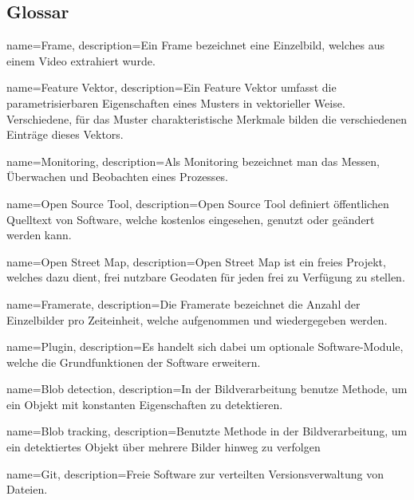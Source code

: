 \subsection{Glossar}

{
  name=Frame,
  description={Ein Frame bezeichnet eine Einzelbild, welches aus einem Video extrahiert wurde. \cite{frame}}
}

{
  name=Feature Vektor,
  description={Ein Feature Vektor umfasst die parametrisierbaren Eigenschaften eines Musters in vektorieller Weise. Verschiedene, für das Muster charakteristische Merkmale bilden die verschiedenen Einträge dieses Vektors. \cite{featureVector}}
}

{
  name=Monitoring,
  description={Als Monitoring bezeichnet man das Messen, Überwachen und Beobachten eines Prozesses. \cite{monitoring}}
}

{
  name=Open Source Tool,
  description={Open Source Tool definiert öffentlichen Quelltext von Software, welche kostenlos eingesehen, genutzt oder geändert werden kann. \cite{ost}}
}

{
  name=Open Street Map,
  description={Open Street Map ist ein freies Projekt, welches dazu dient, frei nutzbare Geodaten für jeden frei zu Verfügung zu stellen. \cite{osm}}
}

{
  name=Framerate,
  description={Die Framerate bezeichnet die Anzahl der Einzelbilder pro Zeiteinheit, welche aufgenommen und wiedergegeben werden. \cite{framerate}}
}

{
  name=Plugin,
  description={Es handelt sich dabei um optionale Software-Module, welche die Grundfunktionen der Software erweitern. \cite{plugin}}
}

{
  name=Blob detection,
  description={In der Bildverarbeitung benutze Methode, um ein Objekt mit konstanten Eigenschaften zu detektieren. \cite{blobDet}}
}

{
  name=Blob tracking,
  description={Benutzte Methode in der Bildverarbeitung, um ein detektiertes Objekt über mehrere Bilder hinweg zu verfolgen}
}


{
  name=Git,
  description={Freie Software zur verteilten Versionsverwaltung von Dateien. \cite{git}}
}

